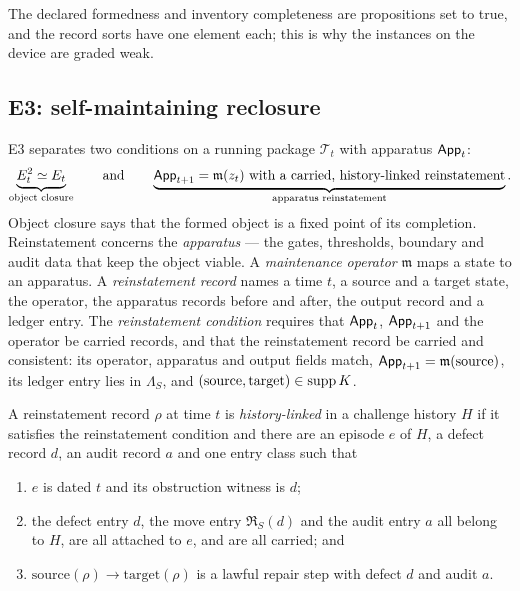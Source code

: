 The declared formedness and inventory completeness are propositions set to true, and the record
sorts have one element each; this is why the instances on the device are graded weak.

\subsection{E3: self-maintaining reclosure}\label{sec:episode}

E3 separates two conditions on a running package $\mathcal T_t$ with apparatus $\mathsf{App}_t$:
\[
  \underbrace{E_t^2 \simeq E_t}_{\text{object closure}}
  \qquad\text{and}\qquad
  \underbrace{\mathsf{App}_{t+1} = \mathfrak m(z_t)\ \text{with a carried, history-linked reinstatement}}
  _{\text{apparatus reinstatement}} .
\]
Object closure says that the formed object is a fixed point of its completion. Reinstatement
concerns the \emph{apparatus} --- the gates, thresholds, boundary and audit data that keep the object
viable. A \emph{maintenance operator} $\mathfrak m$ maps a state to an apparatus. A
\emph{reinstatement record} names a time $t$, a source and a target state, the operator, the
apparatus records before and after, the output record and a ledger entry. The \emph{reinstatement
condition} requires that $\mathsf{App}_t$, $\mathsf{App}_{t+1}$ and the operator be carried records, and that the
reinstatement record be carried and consistent: its operator, apparatus and output fields match,
$\mathsf{App}_{t+1} = \mathfrak m(\text{source})$, its ledger entry lies in $\Lambda_S$, and
$(\text{source}, \text{target}) \in \operatorname{supp} K$.

\begin{definition}\label{def:episode-linked}
A reinstatement record $\rho$ at time $t$ is \emph{history-linked} in a challenge history $H$ if it
satisfies the reinstatement condition and there are an episode $e$ of $H$, a defect record $d$, an
audit record $a$ and one entry class such that
\begin{enumerate}
  \item $e$ is dated $t$ and its obstruction witness is $d$;
  \item the defect entry $d$, the move entry $\mathfrak R_S(d)$ and the audit entry $a$ all belong
    to $H$, are all attached to $e$, and are all carried; and
  \item $\text{source}(\rho) \to \text{target}(\rho)$ is a lawful repair step with defect $d$ and
    audit $a$.
\end{enumerate}
\end{definition}

